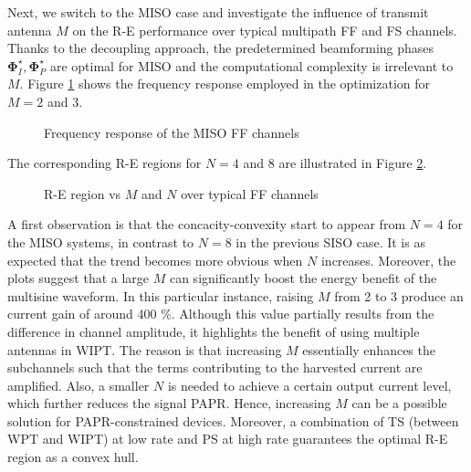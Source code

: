 Next, we switch to the MISO case and investigate the influence of transmit antenna $M$ on the R-E performance over typical multipath FF and FS channels. Thanks to the decoupling approach, the predetermined beamforming phases ${\mathbf{\Phi }}_I^ \star ,{\mathbf{\Phi }}_P^ \star $ are optimal for MISO and the computational complexity is irrelevant to $M$. Figure \ref{fig:miso-channel} shows the frequency response employed in the optimization for $M = 2$ and 3.

\begin{figure}[ht]
  \centering
  \caption{Frequency response of the MISO FF channels}
  \label{fig:miso-channel}
\end{figure}

The corresponding R-E regions for $N = 4$ and 8 are illustrated in Figure \ref{fig:miso-re}.

\begin{figure}[ht]
  \centering
  \caption{R-E region vs $M$ and $N$ over typical FF channels}
  \label{fig:miso-re}
\end{figure}

A first observation is that the concacity-convexity start to appear from $N = 4$ for the MISO systems, in contrast to $N = 8$ in the previous SISO case. It is as expected that the trend becomes more obvious when $N$ increases. Moreover, the plots suggest that a large $M$ can significantly boost the energy benefit of the multisine waveform. In this particular instance, raising $M$ from 2 to 3 produce an current gain of around 400 \%. Although this value partially results from the difference in channel amplitude, it highlights the benefit of using multiple antennas in WIPT. The reason is that increasing $M$ essentially enhances the subchannels such that the terms contributing to the harvested current are amplified. Also, a smaller $N$ is needed to achieve a certain output current level, which further reduces the signal PAPR. Hence, increasing $M$ can be a possible solution for PAPR-constrained devices. Moreover, a combination of TS (between WPT and WIPT) at low rate and PS at high rate guarantees the optimal R-E region as a convex hull.


